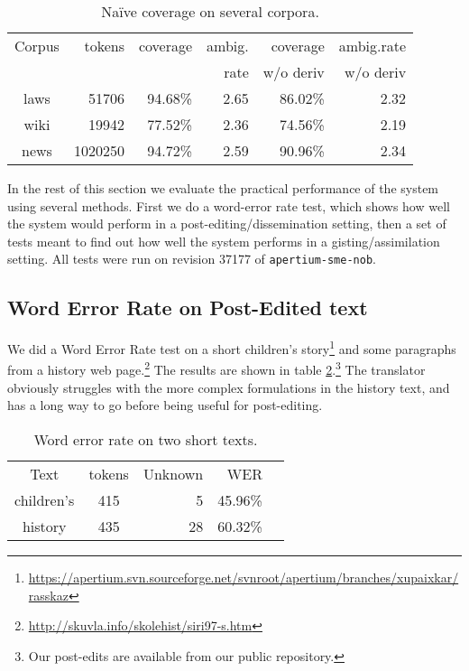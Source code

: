 \documentclass{book}
\begin{document}
\begin{table}
  \begin{center}
  \begin{tabular}{crrrrr}
   Corpus     & tokens   & coverage & ambig.      & coverage   & ambig.rate  \\
              &          &          & rate        & w/o deriv  & w/o deriv \\
   laws       &  51706   & 94.68\%  & 2.65        & 86.02\%    & 2.32 \\
   wiki       & 19942    & 77.52\%  & 2.36        & 74.56\%    & 2.19 \\
   news       & 1020250  & 94.72\%  & 2.59        & 90.96\%    & 2.34 \\
  \end{tabular}
    \caption{Na\"{i}ve coverage on several corpora.}
    \label{table:cov}
  \end{center}
\end{table}
In the rest of this section we evaluate the practical performance of
the system using several methods. First we do a word-error rate test,
which shows how well the system would perform in a
post-editing/dissemination setting, then a set of tests meant to find
out how well the system performs in a gisting/assimilation setting.
All tests were run on revision 37177 of \texttt{apertium-sme-nob}.



\subsection{Word Error Rate on Post-Edited text}
\label{sec:WER}
We did a Word Error Rate test on a short children's
story\footnote{\href{https://apertium.svn.sourceforge.net/svnroot/apertium/branches/xupaixkar/rasskaz}{https://apertium.svn.sourceforge.net/svnroot/apertium/branches/xupaixkar/rasskaz}}
and some paragraphs from a history web
page.\footnote{\href{http://skuvla.info/skolehist/siri97-s.htm}{http://skuvla.info/skolehist/siri97-s.htm}}
The results are shown in table \ref{table:wer}.\footnote{Our post-edits
  are available from our public repository.} The translator obviously
struggles with the more complex formulations in the history text, and
has a long way to go before being useful for post-editing.


\begin{table}
  \begin{center}
  \begin{tabular}{ccrrr}
   Text       & tokens & Unknown & WER  \\
   children's & 415     & 5      & 45.96\% \\
   history    & 435     & 28     & 60.32\%  \\
  \end{tabular}
    \caption{Word error rate on two short texts.}
    \label{table:wer}
  \end{center}
\end{table}
\end{document}

